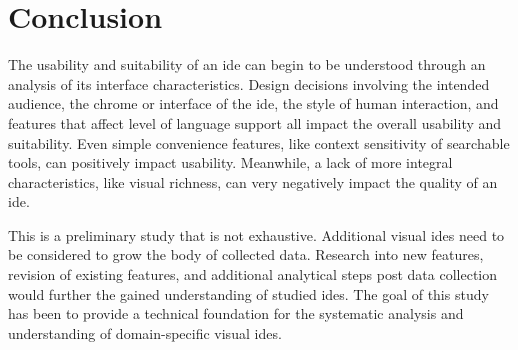 \section{Conclusion}
\label{sec:conclusion}

The usability and suitability of an \ac{ide} can begin to be understood
through an analysis of its interface characteristics. Design decisions
involving the intended audience, the chrome or interface of the \ac{ide},
the style of human interaction, and features that affect level of language
support all impact the overall usability and suitability. Even simple
convenience features, like context sensitivity of searchable tools, can
positively impact usability. Meanwhile, a lack of more integral characteristics,
like visual richness, can very negatively impact the quality of an \ac{ide}.

This is a preliminary study that is not exhaustive. Additional visual \acp{ide} need to be
considered to grow the body of collected data. Research into new features,
revision of existing features, and additional analytical steps post data
collection would further the gained understanding of studied \acp{ide}.
The goal of this study has been to provide a technical foundation for the
systematic analysis and understanding of domain-specific visual \acp{ide}.
